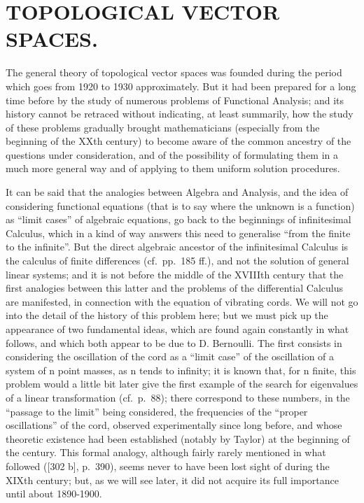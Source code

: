 \chapter{TOPOLOGICAL VECTOR SPACES.}

The general theory of topological vector spaces was founded during the period which goes from 1920 to 1930 approximately. But it had been prepared for a long time before by the study of numerous problems of Functional Analysis; and its history cannot be retraced without indicating, at least summarily, how the study of these problems gradually brought mathematicians (especially from the beginning of the XXth century) to become aware of the common ancestry of the questions under consideration, and of the possibility of formulating them in a much more general way and of applying to them uniform solution procedures.

It can be said that the analogies between Algebra and Analysis, and the idea of considering functional equations (that is to say where the unknown is a function) as ``limit cases'' of algebraic equations, go back to the beginnings of infinitesimal Calculus, which in a kind of way answers this need to generalise ``from the finite to the infinite''. But the direct algebraic ancestor of the infinitesimal Calculus is the calculus of finite differences (cf.~pp.~185 ff.), and not the solution of general linear systems; and it is not before the middle of the XVIIIth century that the first analogies between this latter and the problems of the differential Calculus are manifested, in connection with the equation of vibrating cords. We will not go into the detail of the history of this problem here; but we must pick up the appearance of two fundamental ideas, which are found again constantly in what follows, and which both appear to be due to D. Bernoulli. The first consists in considering the oscillation of the cord as a ``limit case'' of the oscillation of a system of n point masses, as n tends to infinity; it is known that, for n finite, this problem would a little bit later give the first example of the search for eigenvalues of a linear transformation (cf.~p.~88); there correspond to these numbers, in the ``passage to the limit'' being considered, the frequencies of the ``proper oscillations'' of the cord, observed experimentally since long before, and whose theoretic existence had been established (notably by Taylor) at the beginning of the century. This formal analogy, although fairly rarely mentioned in what followed ({[}302 b{]}, p.~390), seems never to have been lost sight of during the XIXth century; but, as we will see later, it did not acquire its full importance until about 1890-1900.

